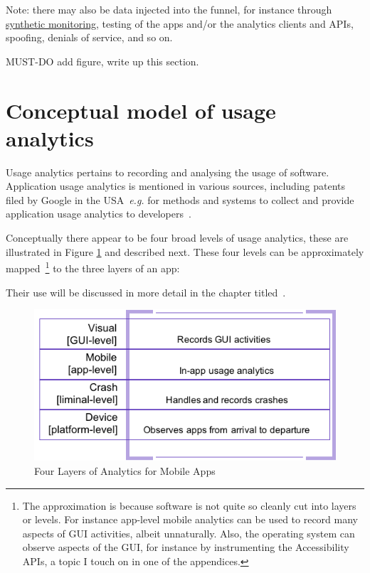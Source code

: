 Note: there may also be data injected into the funnel, for instance through \href{https://en.wikipedia.org/wiki/Synthetic_monitoring}{synthetic monitoring}, testing of the apps and/or the analytics clients and APIs, spoofing, denials of service, and so on. 

MUST-DO add figure, write up this section.




\section{Conceptual model of usage analytics}
Usage analytics pertains to recording and analysing the usage of software. Application usage analytics is mentioned in various sources, including patents filed by Google in the USA~\emph{e.g.} for methods and systems to collect and provide application usage analytics to developers~\citep{googlepatent_hyman2016_collecting_application_usage_analytics}. 

Conceptually there appear to be four broad levels of usage analytics, these are illustrated in Figure \ref{fig:four-layers-of-analytics-for-mobile-apps} and described next. These four levels can be approximately mapped~\footnote{The approximation is because software is not quite so cleanly cut into layers or levels. For instance app-level mobile analytics can be used to record many aspects of GUI activities, albeit unnaturally. Also, the operating system can observe aspects of the GUI, for instance by instrumenting the Accessibility APIs, a topic I touch on in one of the appendices.} to the three layers of an app:


Their use will be discussed in more detail in the chapter titled~\href{chapter-applying-analytics-to-development-practices}{\emph{}}. %

\begin{figure}[ht]
    \centering
    \includegraphics[width=12cm]{images/4-layers-of-analytics.png}
    \caption{Four Layers of Analytics for Mobile Apps}
    \label{fig:four-layers-of-analytics-for-mobile-apps}
\end{figure}

